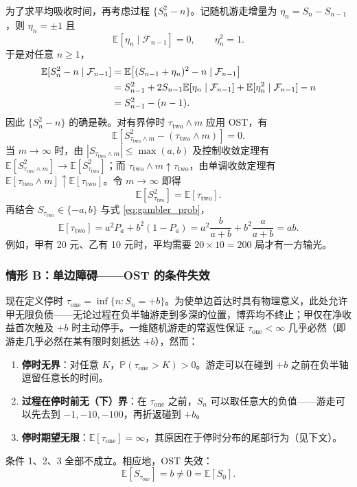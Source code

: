 为了求平均吸收时间，再考虑过程 $\{S_n^2-n\}$。记随机游走增量为 $\eta_n=S_n-S_{n-1}$，则 $\eta_n=\pm1$ 且
\[
\mathbb{E}[\eta_n\mid\mathcal{F}_{n-1}] = 0,\qquad \eta_n^2=1.
\]
于是对任意 $n\geqslant1$，
\begin{align}
  \mathbb{E}[S_n^2-n\mid\mathcal{F}_{n-1}]
  &= \mathbb{E}\big[(S_{n-1}+\eta_n)^2-n \mid \mathcal{F}_{n-1}\big] \notag\\
  &= S_{n-1}^2 + 2S_{n-1}\mathbb{E}[\eta_n\mid\mathcal{F}_{n-1}]
     + \mathbb{E}[\eta_n^2\mid\mathcal{F}_{n-1}] - n \notag\\
  &= S_{n-1}^2 - (n-1).
\end{align}
因此 $\{S_n^2-n\}$ 的确是鞅。对有界停时 $\tau_{\text{two}}\wedge m$ 应用 OST，有
\[
\mathbb{E}[S_{\tau_{\text{two}}\wedge m}^2-(\tau_{\text{two}}\wedge m)] = 0.
\]
当 $m\to\infty$ 时，由 $|S_{\tau_{\text{two}}\wedge m}|\leqslant \max(a,b)$ 及控制收敛定理有 $\mathbb{E}[S_{\tau_{\text{two}}\wedge m}^2] \to \mathbb{E}[S_{\tau_{\text{two}}}^2]$；而 $\tau_{\text{two}}\wedge m \uparrow \tau_{\text{two}}$，由单调收敛定理有 $\mathbb{E}[\tau_{\text{two}}\wedge m] \uparrow \mathbb{E}[\tau_{\text{two}}]$。令 $m\to\infty$ 即得
\[
\mathbb{E}[S_{\tau_{\text{two}}}^2] = \mathbb{E}[\tau_{\text{two}}].
\]
再结合 $S_{\tau_{\text{two}}}\in\{-a,b\}$ 与式 \eqref{eq:gambler_prob}，
\begin{equation}\label{eq:gambler_etau}
  \mathbb{E}[\tau_{\text{two}}]
  = a^2 P_a + b^2(1-P_a)
  = a^2 \frac{b}{a+b} + b^2 \frac{a}{a+b}
  = ab.
\end{equation}
例如，甲有 20 元、乙有 10 元时，平均需要 $20 \times 10 = 200$ 局才有一方输光。

\subsubsection{情形 B：单边障碍——OST 的条件失效}

现在定义停时 $\tau_{\text{one}} = \inf\{n: S_n = +b\}$。为使单边首达时具有物理意义，此处允许甲无限负债——无论过程在负半轴游走到多深的位置，博弈均不终止；甲仅在净收益首次触及 $+b$ 时主动停手。一维随机游走的常返性保证 $\tau_{\text{one}} < \infty$ 几乎必然（即游走几乎必然在某有限时刻抵达 $+b$），然而：

\begin{enumerate}[noitemsep]
  \item \textbf{停时无界}：对任意 $K$，$\mathbb{P}(\tau_{\text{one}} > K) > 0$。游走可以在碰到 $+b$ 之前在负半轴逗留任意长的时间。
  \item \textbf{过程在停时前无（下）界}：在 $\tau_{\text{one}}$ 之前，$S_n$ 可以取任意大的负值——游走可以先去到 $-1, -10, -100$，再折返碰到 $+b$。
  \item \textbf{停时期望无限}：$\mathbb{E}[\tau_{\text{one}}] = \infty$，其原因在于停时分布的尾部行为（见下文）。
\end{enumerate}
条件 1、2、3 全部不成立。相应地，OST 失效：
\begin{equation}
  \mathbb{E}[S_{\tau_{\text{one}}}] = b \neq 0 = \mathbb{E}[S_0].
\end{equation}

